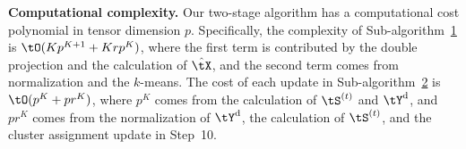 \documentclass[lettersize,onecolumn,journal]{IEEEtran}
\theoremstyle{definition}
\theoremstyle{definition}
\begin{document}



{\bf Computational complexity.} Our two-stage algorithm has a computational cost polynomial in tensor dimension $p$. Specifically, the complexity of Sub-algorithm~\hyperref[alg:main]{1} is $\tO(K p^{K+1} + Krp^K)$, where the first term is contributed by the double projection and the calculation of $\hat \tX$, and the second term comes from normalization and the $k$-means. The cost of each update in Sub-algorithm~\hyperref[alg:main]{2} is $\tO(p^K + pr^K)$, where $p^K$ comes from the calculation of $\tS^{(t)}$ and $\tY^{\text{d}}$, and $pr^K$ comes from the normalization of $\tY^{\text{d}}$, the calculation of $\tS^{(t)}$, and the cluster assignment update in Step~10.
\end{document}
